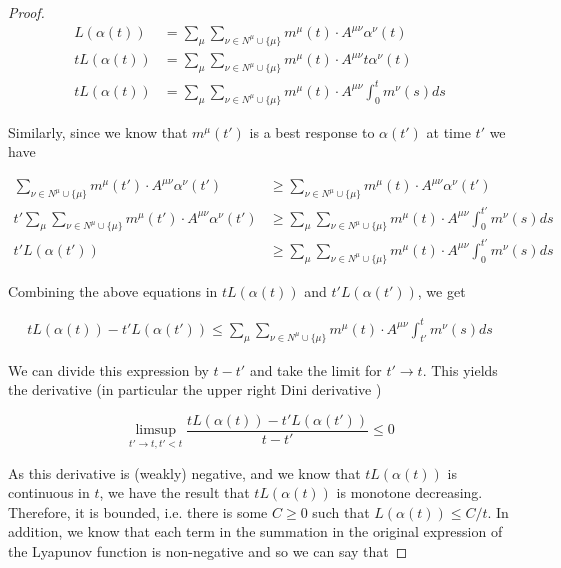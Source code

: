 \documentclass{article}
\theoremstyle{definition}
\begin{document}
\begin{proof}
    \begin{align}
      L(\alpha(t)) & = \sum_\mu \sum_{\nu \in N^\mu \cup \{\mu\}} m^\mu(t) \cdot A^{\mu \nu} \alpha^\nu(t) \\
      t L(\alpha(t)) & = \sum_\mu \sum_{\nu \in N^\mu \cup \{\mu\}} m^\mu(t) \cdot A^{\mu \nu} t \alpha^\nu(t) \\
      t L(\alpha(t)) & = \sum_\mu \sum_{\nu \in N^\mu \cup \{\mu\}} m^\mu(t) \cdot A^{\mu \nu} \int_0^t m^\nu(s) ds
    \end{align}

    Similarly, since we know that $m^\mu(t')$ is a best response to $\alpha(t')$ at time $t'$ we have

    \begin{align}
      \sum_{\nu \in N^\mu \cup \{\mu\}} m^\mu(t') \cdot A^{\mu \nu} \alpha^\nu(t') & \geq \sum_{\nu \in N^\mu \cup \{\mu\}} m^\mu(t) \cdot A^{\mu \nu} \alpha^\nu(t') \\
      t' \sum_\mu \sum_{\nu \in N^\mu \cup \{\mu\}} m^\mu(t') \cdot A^{\mu \nu} \alpha^\nu(t') & \geq \sum_\mu \sum_{\nu \in N^\mu \cup \{\mu\}} m^\mu(t) \cdot A^{\mu \nu} \int_0^{t'} m^\nu(s) ds \\
      t' L(\alpha(t')) & \geq \sum_\mu \sum_{\nu \in N^\mu \cup \{\mu\}} m^\mu(t) \cdot A^{\mu \nu} \int_0^{t'} m^\nu(s) ds 
    \end{align}

    Combining the above equations in $t L(\alpha(t))$ and $t' L(\alpha(t'))$, we get

    \begin{align}
      t L(\alpha(t)) - t' L(\alpha(t')) \leq \sum_\mu \sum_{\nu \in N^\mu \cup \{\mu\}} m^\mu(t) \cdot A^{\mu \nu} \int_{t'}^{t} m^\nu(s) ds 
    \end{align}

    We can divide this expression by $t - t'$ and take the limit for $t' \rightarrow t$. This yields the derivative (in particular the upper right Dini derivative \cite{Royden})

    \begin{equation}
      \limsup_{t' \rightarrow t, t' < t}\frac{t L(\alpha(t)) - t' L(\alpha(t'))}{t - t'} \leq 0
    \end{equation}

    As this derivative is (weakly) negative, and we know that $tL(\alpha(t))$ is continuous in $t$, we have the result that $t L(\alpha(t))$ is monotone decreasing. Therefore, it is bounded, i.e. there is some $C \geq 0$ such that $L(\alpha(t)) \leq C/t$. In addition, we know that each term in the summation in the original expression of the Lyapunov function is non-negative and so we can say that


\end{proof}
\end{document}

